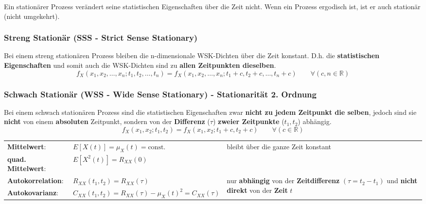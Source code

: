 Ein stationärer Prozess verändert seine statistischen Eigenschaften über die
Zeit nicht. Wenn ein Prozess ergodisch ist, ist er auch stationär (nicht
umgekehrt).\\

\subsubsection{Streng Stationär (SSS - Strict Sense Stationary)}
Bei einem streng stationären Prozess bleiben die n-dimensionale WSK-Dichten über die
Zeit konstant. D.h. die \textbf{statistischen Eigenschaften} und somit auch die WSK-Dichten sind zu 
\textbf{allen Zeitpunkten dieselben}.
$$ f_X(x_1, x_2, \ldots, x_n; t_1, t_2, \ldots, t_n) =
		f_X(x_1, x_2, \ldots, x_n; t_1+c, t_2+c, \ldots, t_n+c) \qquad \forall (c,n \in
		\mathbb{R})$$

\subsubsection{Schwach Stationär (WSS - Wide Sense Stationary) - Stationarität 2. Ordnung}
Bei einem schwach stationären Prozess sind die statistischen Eigenschaften zwar
\textbf{nicht zu jedem Zeitpunkt die selben}, jedoch sind sie \textbf{nicht} von einem \textbf{absoluten} Zeitpunkt, sondern
von der \textbf{Differenz} ($\tau$) \textbf{zweier Zeitpunkte} ($t_1, t_2$) abhängig.  \\ 
$$ f_X(x_1, x_2; t_1, t_2) = f_X(x_1, x_2; t_1+c, t_2+c) \qquad \forall (c \in
		\mathbb{R})$$
\renewcommand{\arraystretch}{1.4}
\begin{tabular}[c]{ p{3.3cm}  p{6.5cm} p{8cm} }
	\textbf{Mittelwert}: 	&  $E[X(t)] = \mu_{X}(t) = \text{const.}$  
							& bleibt über die ganze Zeit konstant\\ 
	\textbf{quad. Mittelwert}: 	&  $E[X^{2}(t)] = R_{XX}(0)$  \\ 
	\textbf{Autokorrelation}: 	& 	$R_{XX}(t_{1},t_{2}) = R_{XX}(\tau)$
	& \multirow{2}{8cm}{nur \textbf{abhängig} von der \textbf{Zeitdifferenz} $(\tau = t_2 - t_1)$ und \textbf{nicht direkt} von
	 der \textbf{Zeit} $t$} \\
	 \textbf{Autokovarianz}:		& $ C_{XX}(t_{1},t_{2}) = R_{XX}(\tau) - \mu_{X}(t)^{2} = C_{XX}(\tau)$ \\
\end{tabular}
\renewcommand{\arraystretch}{1}
 
